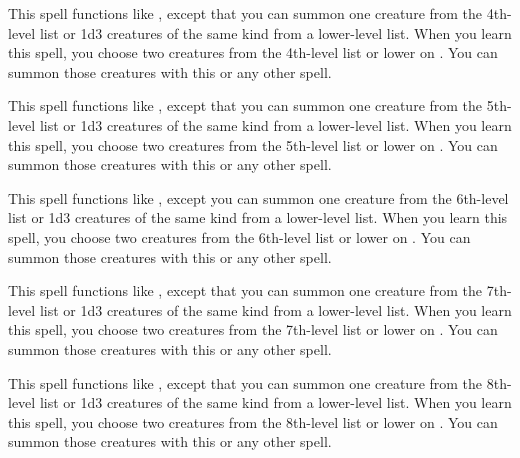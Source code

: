 \spelleffect This spell functions like , except that you can summon one creature from the 4th-level list or 1d3 creatures of the same kind from a lower-level list. When you learn this spell, you choose two creatures from the 4th-level list or lower on . You can summon those creatures with this or any other  spell.

\spelleffect This spell functions like , except that you can summon one creature from the 5th-level list or 1d3 creatures of the same kind from a lower-level list. When you learn this spell, you choose two creatures from the 5th-level list or lower on . You can summon those creatures with this or any other  spell.

\spelleffect This spell functions like , except you can summon one creature from the 6th-level list or 1d3 creatures of the same kind from a lower-level list. When you learn this spell, you choose two creatures from the 6th-level list or lower on . You can summon those creatures with this or any other  spell.

\spelleffect This spell functions like , except that you can summon one creature from the 7th-level list or 1d3 creatures of the same kind from a lower-level list. When you learn this spell, you choose two creatures from the 7th-level list or lower on . You can summon those creatures with this or any other  spell.

\spelleffect This spell functions like , except that you can summon one creature from the 8th-level list or 1d3 creatures of the same kind from a lower-level list. When you learn this spell, you choose two creatures from the 8th-level list or lower on . You can summon those creatures with this or any other  spell.

